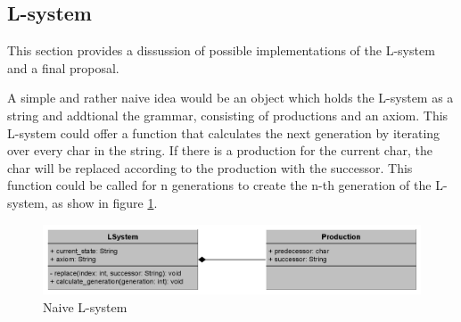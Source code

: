 \documentclass[english]{cpp-hmwk}
\begin{document}
\subsection{L-system}
\label{section:lsystem_discussion}
This section provides a dissussion of possible implementations of the L-system and a final proposal.

\medskip

\noindent A simple and rather naive idea would be an object which holds the L-system as a string and addtional the grammar, consisting of productions and an axiom. This L-system could offer a function that calculates the next generation by iterating over every char in the string. If there is a production for the current char, the char will be replaced according to the production with the successor. This function could be called for n generations to create the n-th generation of the L-system, as show in figure \ref{figure:naive_lsystem}.

\begin{figure}[h!]
	\centering
	\includegraphics[width=1\columnwidth]{../graphs/LSystem/naive/class_diagram_l_system_naive.png}
	\caption{Naive L-system}
	\label{figure:naive_lsystem}
\end{figure}
\end{document}
